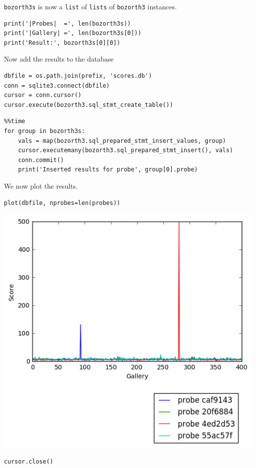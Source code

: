 \texttt{bozorth3s} is now a \texttt{list} of \texttt{lists} of
\texttt{bozorth3} instances.

\begin{verbatim}
print('|Probes|  =', len(bozorth3s))
print('|Gallery| =', len(bozorth3s[0]))
print('Result:', bozorth3s[0][0])
\end{verbatim}

Now add the results to the database

\begin{verbatim}
dbfile = os.path.join(prefix, 'scores.db')
conn = sqlite3.connect(dbfile)
cursor = conn.cursor()
cursor.execute(bozorth3.sql_stmt_create_table())
\end{verbatim}

\begin{verbatim}
%%time
for group in bozorth3s:
    vals = map(bozorth3.sql_prepared_stmt_insert_values, group)
    cursor.executemany(bozorth3.sql_prepared_stmt_insert(), vals)
    conn.commit()
    print('Inserted results for probe', group[0].probe)
\end{verbatim}

We now plot the results.

\begin{verbatim}
plot(dbfile, nprobes=len(probes))
\end{verbatim}

\includegraphics{fingerprint_matching_files/fingerprint_matching_74_0.png}

\begin{verbatim}
cursor.close()
\end{verbatim}
